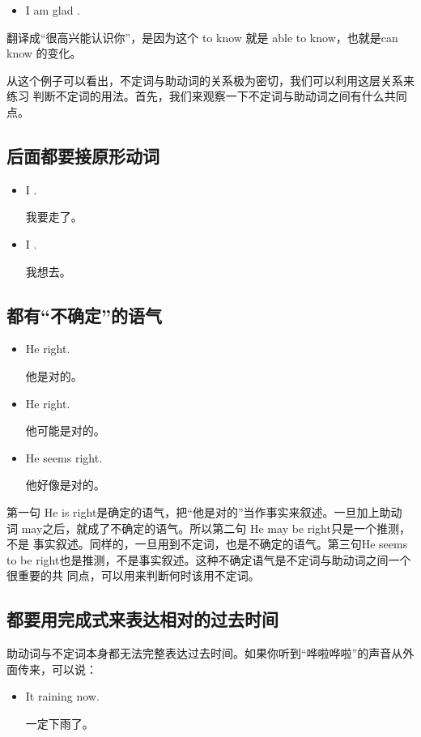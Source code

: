 \begin{itemize}
\item  I am glad .
\end{itemize}

翻译成“很高兴能认识你”，是因为这个 to know 就是 able to know，也就是can
know 的变化。

从这个例子可以看出，不定词与助动词的关系极为密切，我们可以利用这层关系来练习
判断不定词的用法。首先，我们来观察一下不定词与助动词之间有什么共同点。

\subsection{后面都要接原形动词}

\begin{itemize}
\item I .

  我要走了。
\item I .

  我想去。
\end{itemize}

\subsection{都有“不确定”的语气}

\begin{itemize}
\item He  right.

  他是对的。
\item He  right.

  他可能是对的。
\item He seems  right.

  他好像是对的。
\end{itemize}

第一句 He is right是确定的语气，把“他是对的”当作事实来叙述。一旦加上助动
词 may之后，就成了不确定的语气。所以第二句 He may be right只是一个推测，不是
事实叙述。同样的，一旦用到不定词，也是不确定的语气。第三句He seems to be
right也是推测，不是事实叙述。这种不确定语气是不定词与助动词之间一个很重要的共
同点，可以用来判断何时该用不定词。

\subsection{都要用完成式来表达相对的过去时间}

助动词与不定词本身都无法完整表达过去时间。如果你听到“哗啦哗啦”的声音从外面传来，可以说：
\begin{itemize}
\item It  raining now.

  一定下雨了。
\end{itemize}

